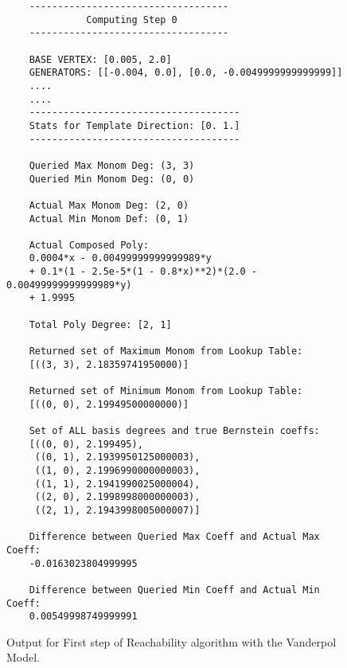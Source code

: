 \begin{figure}
\begin{verbatim}
    -----------------------------------
              Computing Step 0
    -----------------------------------

    BASE VERTEX: [0.005, 2.0]
    GENERATORS: [[-0.004, 0.0], [0.0, -0.0049999999999999]]
    ....
    ....
    -------------------------------------
    Stats for Template Direction: [0. 1.]
    -------------------------------------

    Queried Max Monom Deg: (3, 3)
    Queried Min Monom Deg: (0, 0)

    Actual Max Monom Deg: (2, 0)
    Actual Min Monom Def: (0, 1)

    Actual Composed Poly:
    0.0004*x - 0.00499999999999989*y
    + 0.1*(1 - 2.5e-5*(1 - 0.8*x)**2)*(2.0 - 0.00499999999999989*y)
    + 1.9995

    Total Poly Degree: [2, 1]

    Returned set of Maximum Monom from Lookup Table:
    [((3, 3), 2.18359741950000)]

    Returned set of Minimum Monom from Lookup Table:
    [((0, 0), 2.19949500000000)]

    Set of ALL basis degrees and true Bernstein coeffs:
    [((0, 0), 2.199495),
     ((0, 1), 2.1939950125000003),
     ((1, 0), 2.1996990000000003),
     ((1, 1), 2.1941990025000004),
     ((2, 0), 2.1998998000000003),
     ((2, 1), 2.1943998005000007)]

    Difference between Queried Max Coeff and Actual Max Coeff:
    -0.0163023804999995
    
    Difference between Queried Min Coeff and Actual Min Coeff:
    0.00549998749999991
  \end{verbatim}
  \caption{Output for First step of Reachability algorithm with the Vanderpol Model.}
  \label{fig:bern_prune_deg_output}
\end{figure}
